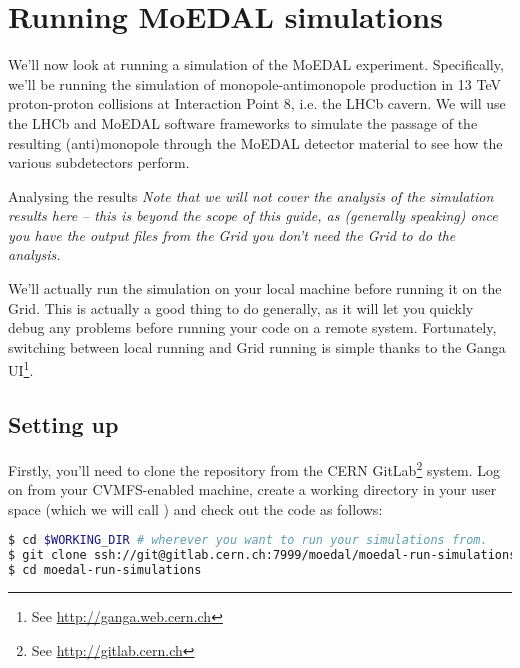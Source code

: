 \section{Running MoEDAL simulations}
\label{sec:sim}
We'll now look at running a simulation of the \ac{MoEDAL} experiment.
Specifically, we'll be running the simulation of
monopole-antimonopole production in 13 TeV proton-proton collisions
at Interaction Point 8, i.e. the \ac{LHCb} cavern.
We will use the \ac{LHCb} and \ac{MoEDAL} software frameworks to 
simulate the passage of the resulting (anti)monopole through the
\ac{MoEDAL} detector material to see how the various subdetectors perform.

\begin{infobox}{Analysing the results}
\emph{Note that we will not cover the analysis of the simulation results
here -- this is beyond the scope of this guide,
as (generally speaking) once you have the output files from the Grid
you don't need the Grid to do the analysis.}
\end{infobox}

We'll actually run the simulation on your local machine before running it
on the Grid.  This is actually a good thing to do generally,
as it will let you quickly debug any problems before running your code
on a remote system. Fortunately, switching between local running
and Grid running is simple thanks to the Ganga \ac{UI}\footnote{
See \href{http://ganga.web.cern.ch}{http://ganga.web.cern.ch}}.

\subsection{Setting up}
\label{sec:moedalgridsetup}
Firstly, you'll need to clone the repository from the \ac{CERN}
GitLab\footnote{See \href{http://gitlab.cern.ch}{http://gitlab.cern.ch}}
system. Log on from your \ac{CVMFS}-enabled machine, create a working
directory in your user space (which we will call )
and check out the code as follows:

\begin{lstlisting}[gobble=0,numbers=none,language=bash]
$ cd $WORKING_DIR # wherever you want to run your simulations from.
$ git clone ssh://git@gitlab.cern.ch:7999/moedal/moedal-run-simulations.git
$ cd moedal-run-simulations
\end{lstlisting}

